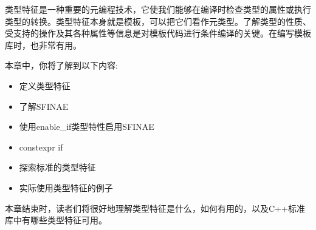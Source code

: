 类型特征是一种重要的元编程技术，它使我们能够在编译时检查类型的属性或执行类型的转换。类型特征本身就是模板，可以把它们看作元类型。了解类型的性质、受支持的操作及其各种属性等信息是对模板代码进行条件编译的关键。在编写模板库时，也非常有用。

本章中，你将了解到以下内容:

\begin{itemize}
\item
定义类型特征

\item
了解SFINAE

\item
使用enable\_if类型特性启用SFINAE

\item
constexpr if

\item
探索标准的类型特征

\item
实际使用类型特征的例子
\end{itemize}

本章结束时，读者们将很好地理解类型特征是什么，如何有用的，以及C++标准库中有哪些类型特征可用。




























